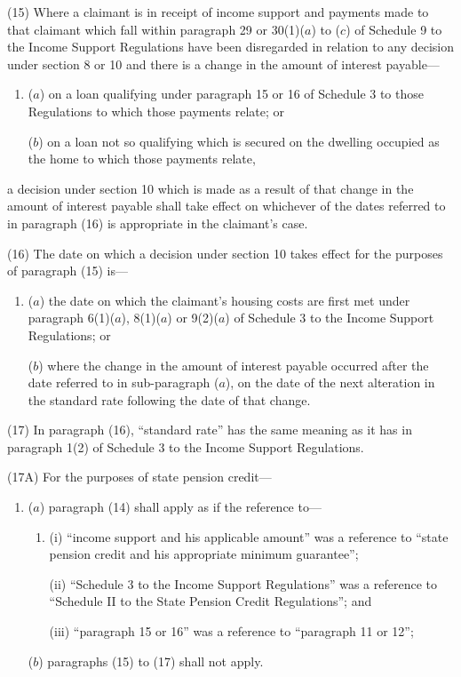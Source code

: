 \documentclass[12pt,a4paper]{article}
\begin{document}
(15) Where a claimant is in receipt of income support and payments made to that claimant which fall within paragraph 29 or 30(1)($a$) to ($c$) of Schedule 9 to the Income Support Regulations have been disregarded in relation to any decision under section 8 or 10 and there is a change in the amount of interest payable—
\begin{enumerate}\item[]
($a$) on a loan qualifying under paragraph 15 or 16 of Schedule 3 to those Regulations to which those payments relate; or

($b$) on a loan not so qualifying which is secured on the dwelling occupied as the home to which those payments relate,
\end{enumerate}
a decision under section 10 which is made as a result of that change in the amount of interest payable shall take effect on whichever of the dates referred to in paragraph (16) is appropriate in the claimant’s case.

(16) The date on which a decision under section 10 takes effect for the purposes of paragraph (15) is—
\begin{enumerate}\item[]
($a$) the date on which the claimant’s housing costs are first met under paragraph 6(1)($a$), 8(1)($a$) or 9(2)($a$) of Schedule 3 to the Income Support Regulations; or

($b$) where the change in the amount of interest payable occurred after the date referred to in sub-paragraph ($a$), on the date of the next alteration in the standard rate following the date of that change.
\end{enumerate}

(17) In paragraph (16), “standard rate” has the same meaning as it has in paragraph 1(2) of Schedule 3 to the Income Support Regulations.

(17A) For the purposes of state pension credit—
\begin{enumerate}\item[]
($a$) paragraph (14) shall apply as if the reference to—
\begin{enumerate}\item[]
(i) “income support and his applicable amount” was a reference to “state pension credit and his appropriate minimum guarantee”;

(ii) “Schedule 3 to the Income Support Regulations” was a reference to “Schedule II to the State Pension Credit Regulations”; and

(iii) “paragraph 15 or 16” was a reference to “paragraph 11 or 12”;
\end{enumerate}

($b$) paragraphs (15) to (17) shall not apply.
\end{enumerate}
\end{document}
